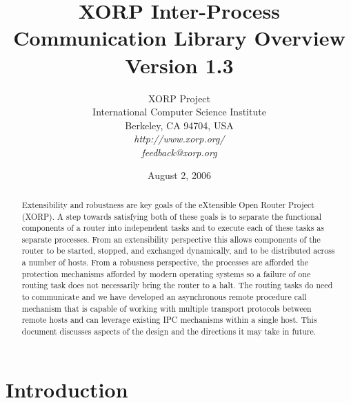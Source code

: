 \documentclass[11pt]{article}
\begin{document}
\title{XORP Inter-Process Communication Library Overview \\
\vspace{1ex}
Version 1.3}
\author{ XORP Project					\\
	 International Computer Science Institute	\\
	 Berkeley, CA 94704, USA			\\
         {\it http://www.xorp.org/}			\\
	 {\it feedback@xorp.org}
}
\date{August 2, 2006}

\maketitle

\thispagestyle{empty}

\begin{abstract}

Extensibility and robustness are key goals of the eXtensible Open
Router Project (XORP).  A step towards satisfying both of these goals
is to separate the functional components of a router into independent
tasks and to execute each of these tasks as separate processes.  From
an extensibility perspective this allows components of the router to
be started, stopped, and exchanged dynamically, and to be distributed
across a number of hosts.  From a robusness perspective, the processes
are afforded the protection mechanisms afforded by modern operating
systems so a failure of one routing task does not necessarily bring
the router to a halt. The routing tasks do need to communicate and we
have developed an asynchronous remote procedure call mechanism that is
capable of working with multiple transport protocols between remote
hosts and can leverage existing IPC mechanisms within a single
host. This document discusses aspects of the design and the directions
it may take in future.

\end{abstract}

\section{Introduction}
\end{document}
